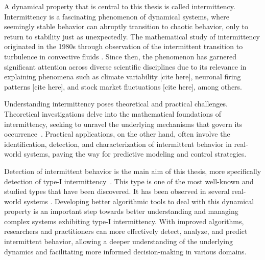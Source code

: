 A dynamical property that is central to this thesis is called intermittency.
Intermittency is a fascinating phenomenon of dynamical systems, where seemingly stable behavior can abruptly transition to chaotic behavior, only to return to stability just as unexpectedly.
The mathematical study of intermittency originated in the 1980s through observation of the intermittent transition to turbulence in convective fluids \cite{Pomeau1980}.
Since then, the phenomenon has garnered significant attention across diverse scientific disciplines due to its relevance in explaining phenomena such as climate variability [cite here], neuronal firing patterns [cite here], and stock market fluctuations [cite here], among others.
\par
Understanding intermittency poses theoretical and practical challenges.
Theoretical investigations delve into the mathematical foundations of intermittency, seeking to unravel the underlying mechanisms that govern its occurrence~\cite{Elaskar2017, Elaskar2023}.
Practical applications, on the other hand, often involve the identification, detection, and characterization of intermittent behavior in real-world systems, paving the way for predictive modeling and control strategies.
\par
Detection of intermittent behavior is the main aim of this thesis, more specifically detection of type-I intermittency~\cite{Pomeau1980,Bussac1982,Elaskar2022,DelRio2014}.
This type is one of the most well-known and studied types that have been discovered.
It has been observed in several real-world systems \cite{Zebrowski2004,Zebrowski2005,Parthimos2001,Aikawa1990,Shiau1995,Storchi2010,Dimitriu2008,Chiriac20070701}.
Developing better algorithmic tools to deal with this dynamical property is an important step towards better understanding and managing complex systems exhibiting type-I intermittency.
With improved algorithms, researchers and practitioners can more effectively detect, analyze, and predict intermittent behavior, allowing a deeper understanding of the underlying dynamics and facilitating more informed decision-making in various domains.



